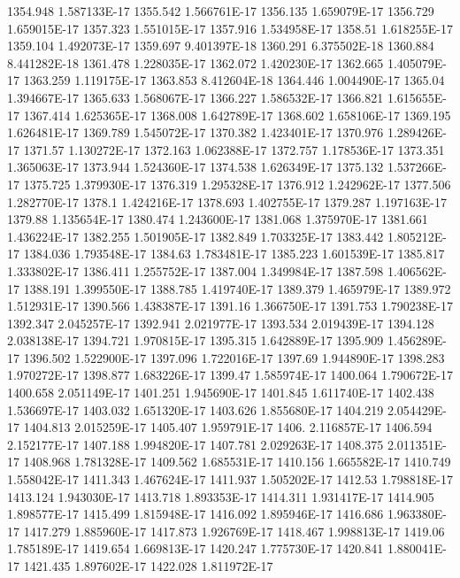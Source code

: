 1354.948  1.587133E-17
1355.542  1.566761E-17
1356.135  1.659079E-17
1356.729  1.659015E-17
1357.323  1.551015E-17
1357.916  1.534958E-17
1358.51  1.618255E-17
1359.104  1.492073E-17
1359.697  9.401397E-18
1360.291  6.375502E-18
1360.884  8.441282E-18
1361.478  1.228035E-17
1362.072  1.420230E-17
1362.665  1.405079E-17
1363.259  1.119175E-17
1363.853  8.412604E-18
1364.446  1.004490E-17
1365.04  1.394667E-17
1365.633  1.568067E-17
1366.227  1.586532E-17
1366.821  1.615655E-17
1367.414  1.625365E-17
1368.008  1.642789E-17
1368.602  1.658106E-17
1369.195  1.626481E-17
1369.789  1.545072E-17
1370.382  1.423401E-17
1370.976  1.289426E-17
1371.57  1.130272E-17
1372.163  1.062388E-17
1372.757  1.178536E-17
1373.351  1.365063E-17
1373.944  1.524360E-17
1374.538  1.626349E-17
1375.132  1.537266E-17
1375.725  1.379930E-17
1376.319  1.295328E-17
1376.912  1.242962E-17
1377.506  1.282770E-17
1378.1  1.424216E-17
1378.693  1.402755E-17
1379.287  1.197163E-17
1379.88  1.135654E-17
1380.474  1.243600E-17
1381.068  1.375970E-17
1381.661  1.436224E-17
1382.255  1.501905E-17
1382.849  1.703325E-17
1383.442  1.805212E-17
1384.036  1.793548E-17
1384.63  1.783481E-17
1385.223  1.601539E-17
1385.817  1.333802E-17
1386.411  1.255752E-17
1387.004  1.349984E-17
1387.598  1.406562E-17
1388.191  1.399550E-17
1388.785  1.419740E-17
1389.379  1.465979E-17
1389.972  1.512931E-17
1390.566  1.438387E-17
1391.16  1.366750E-17
1391.753  1.790238E-17
1392.347  2.045257E-17
1392.941  2.021977E-17
1393.534  2.019439E-17
1394.128  2.038138E-17
1394.721  1.970815E-17
1395.315  1.642889E-17
1395.909  1.456289E-17
1396.502  1.522900E-17
1397.096  1.722016E-17
1397.69  1.944890E-17
1398.283  1.970272E-17
1398.877  1.683226E-17
1399.47  1.585974E-17
1400.064  1.790672E-17
1400.658  2.051149E-17
1401.251  1.945690E-17
1401.845  1.611740E-17
1402.438  1.536697E-17
1403.032  1.651320E-17
1403.626  1.855680E-17
1404.219  2.054429E-17
1404.813  2.015259E-17
1405.407  1.959791E-17
1406.  2.116857E-17
1406.594  2.152177E-17
1407.188  1.994820E-17
1407.781  2.029263E-17
1408.375  2.011351E-17
1408.968  1.781328E-17
1409.562  1.685531E-17
1410.156  1.665582E-17
1410.749  1.558042E-17
1411.343  1.467624E-17
1411.937  1.505202E-17
1412.53  1.798818E-17
1413.124  1.943030E-17
1413.718  1.893353E-17
1414.311  1.931417E-17
1414.905  1.898577E-17
1415.499  1.815948E-17
1416.092  1.895946E-17
1416.686  1.963380E-17
1417.279  1.885960E-17
1417.873  1.926769E-17
1418.467  1.998813E-17
1419.06  1.785189E-17
1419.654  1.669813E-17
1420.247  1.775730E-17
1420.841  1.880041E-17
1421.435  1.897602E-17
1422.028  1.811972E-17
